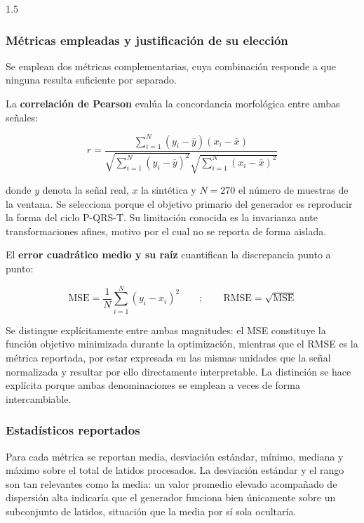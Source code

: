\begin{spacing}{1.5}
\subsubsection{Métricas empleadas y justificación de su elección}\label{sec:metricas}

Se emplean dos métricas complementarias, cuya combinación responde a que ninguna resulta suficiente por separado.

La \textbf{correlación de Pearson} evalúa la concordancia morfológica entre ambas señales:

\begin{equation}
r = \frac{\sum_{i=1}^{N}(y_i - \bar{y})(x_i - \bar{x})}{\sqrt{\sum_{i=1}^{N}(y_i - \bar{y})^2}\sqrt{\sum_{i=1}^{N}(x_i - \bar{x})^2}}
\end{equation}

donde $y$ denota la señal real, $x$ la sintética y $N = 270$ el número de muestras de la ventana. Se selecciona porque el objetivo primario del generador es reproducir la forma del ciclo P-QRS-T. Su limitación conocida es la invarianza ante transformaciones afines, motivo por el cual no se reporta de forma aislada.

El \textbf{error cuadrático medio y su raíz} cuantifican la discrepancia punto a punto:

\begin{equation}
\mathrm{MSE} = \frac{1}{N}\sum_{i=1}^{N}(y_i - x_i)^2 \qquad ; \qquad \mathrm{RMSE} = \sqrt{\mathrm{MSE}}
\end{equation}

Se distingue explícitamente entre ambas magnitudes: el MSE constituye la función objetivo minimizada durante la optimización, mientras que el RMSE es la métrica reportada, por estar expresada en las mismas unidades que la señal normalizada y resultar por ello directamente interpretable. La distinción se hace explícita porque ambas denominaciones se emplean a veces de forma intercambiable.

\subsubsection{Estadísticos reportados}

Para cada métrica se reportan media, desviación estándar, mínimo, mediana y máximo sobre el total de latidos procesados. La desviación estándar y el rango son tan relevantes como la media: un valor promedio elevado acompañado de dispersión alta indicaría que el generador funciona bien únicamente sobre un subconjunto de latidos, situación que la media por sí sola ocultaría.


\end{spacing}

